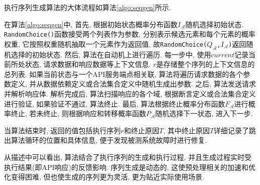         执行序列生成算法的大体流程如算法\ref{algo:seqgen}所示.
        
        在算法\ref{algo:seqgen}中, 首先, 根据初始状态概率分布函数$I_{\mathcal{A}}$随机选择初始状态. \texttt{RandomChoice()}函数接受两个列表作为参数, 分别表示候选元素和每个元素的概率权重, 它按照权重随机抽取一个元素作为返回值, 故\texttt{RandomChoice(}$Q_{\mathcal{A}}$\texttt{,}$I_{\mathcal{A}}$\texttt{)}返回随机选择的初始状态. 然后, 算法在自动机上进行遍历. 每一步中, 使用$current$记录当前所处状态, 请求数据和响应数据等上下文信息. $r$是存储整个序列的上下文信息的总列表. 如果当前状态与一个API服务端点相关联, 算法将遍历请求数据的各个参数定义, 并从数据依赖定义或合法集合定义中随机生成出参数. 之后, 算法发送请求并解析响应体. 解析完成后, 算法扫描响应的各个域, 根据断言定义或合法集合定义进行验证, 如果验证不通过, 算法终止. 最后, 算法根据终止概率分布函数$F_{\mathcal{A}}$进行概率终止, 若未终止, 则根据响应和转移概率函数$P_{\mathcal{A}}$随机选择下一状态, 进入下一步.
        
        当算法结束时, 返回的值包括执行序列$r$和终止原因$T$, 其中终止原因$T$详细记录了跳出算法循环的位置和具体信息, 便于发现被测系统故障时进行修复.
        
        从描述中可以看出, 算法结合了执行序列的生成和执行过程, 并且生成过程实时受执行结果(即API响应)的反馈影响. 序列生成是动态的, 这使预处理相关的加速和优化变得困难, 但也使生成的序列更为灵活, 更为贴近实际使用场景.
        
